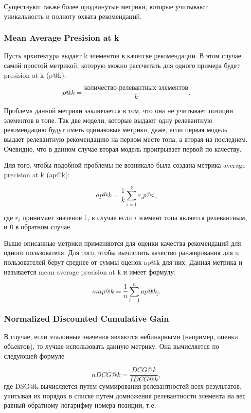 \documentclass[bachelor, och, coursework]{SCWorks}
\begin{document}
Существуют также более продвинутые метрики, которые учитывают уникальность и полноту охвата рекомендаций.

\subsubsection{Mean Average Presision at k}
Пусть архитектура выдает k элементов в качетсве рекомендации. В этом случае самой простой метрикой, которую
можно рассчитать для одного примера будет presision at k (p@k):

\begin{equation}
    p@k = \frac{\text{количество релевантных элементов}}{k}.
\end{equation}

Проблема данной метрики заключается в том, что она не учитывает позиции элементов в топе. Так две модели, которые
выдают одну релевантную рекомендацию будут иметь одинаковые метрики, даже, если первая модель выдает релевантную
рекомендацию на первом месте топа, а вторая на последнем. Очевидно, что в данном случае вторая модель проигрывает
первой по качеству.

Для того, чтобы подобной проблемы не возникало была создана метрика average precision at k (ap@k):

\begin{equation}
    ap@k = \frac{1}{k}\sum_{i=1}^{k}r_ip@i,
\end{equation}

где $r_i$ принимает значение 1, в случае если $i$ элемент топа является релевантным, и 0 в обратном случае.

Выше описанные метрики применяются для оценки качества рекомендаций для одного пользователя. Для того, чтобы
вычислить качество ранжирования для $n$ пользователей берут среднее от суммы оценок ap@k для них. Данная метрика
и называется mean average presision at k и имеет формулу:

\begin{equation}
    map@k = \frac{1}{n}\sum_{i=1}^{n}ap@k_j.
\end{equation}

\subsubsection{Normalized Discounted Cumulative Gain}
В случае, если эталонные значения являются небинарными (например, оценки объектов), то лучше использовать
данную метрику. Она вычисляется по следующей формуле

\begin{equation}
    nDCG@k = \frac{DCG@k}{IDCG@k},
\end{equation}
где DSG@k вычисляется путем суммирования релевантностей всех результатов, учитывая их порядок в списке путем домножения релевантности элемента на вес равный обратному логарифму номера позиции, т.е.
\end{document}
